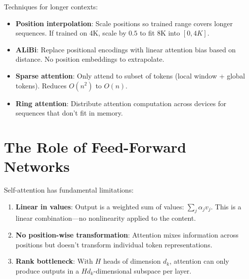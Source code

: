 \begin{remark}
    Techniques for longer contexts:
    \begin{itemize}
        \item \textbf{Position interpolation}: Scale positions so trained range covers longer sequences. If trained on 4K, scale by $0.5$ to fit 8K into $[0, 4K]$.
        \item \textbf{ALiBi}: Replace positional encodings with linear attention bias based on distance. No position embeddings to extrapolate.
        \item \textbf{Sparse attention}: Only attend to subset of tokens (local window + global tokens). Reduces $O(n^2)$ to $O(n)$.
        \item \textbf{Ring attention}: Distribute attention computation across devices for sequences that don't fit in memory.
    \end{itemize}
\end{remark}

\section{The Role of Feed-Forward Networks}

\begin{remark}
    Self-attention has fundamental limitations:
    \begin{enumerate}
        \item \textbf{Linear in values}: Output is a weighted sum of values: $\sum_j \alpha_j v_j$. This is a linear combination---no nonlinearity applied to the content.

        \item \textbf{No position-wise transformation}: Attention mixes information across positions but doesn't transform individual token representations.

        \item \textbf{Rank bottleneck}: With $H$ heads of dimension $d_k$, attention can only produce outputs in a $Hd_k$-dimensional subspace per layer.
    \end{enumerate}
\end{remark}

